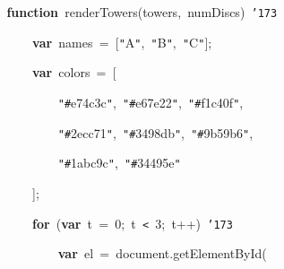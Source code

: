 \documentclass[a4paper,10pt]{article}
\def\mc{\relax}
\begin{document}
\noindent
\mbox{}{\tt\mc \ }{\tt\mc \ }{\tt\mc \ }{\tt\mc \ }{\tt\mc \ }{\tt\mc \ }{\tt\mc \ }{\tt\mc \ }\textbf{function}{\tt\mc \ }renderTowers(towers,{\tt\mc \ }numDiscs){\tt\mc \ }{\tt\char'173}

\noindent
\mbox{}{\tt\mc \ }{\tt\mc \ }{\tt\mc \ }{\tt\mc \ }{\tt\mc \ }{\tt\mc \ }{\tt\mc \ }{\tt\mc \ }{\tt\mc \ }{\tt\mc \ }{\tt\mc \ }{\tt\mc \ }\textbf{var}{\tt\mc \ }names{\tt\mc \ }={\tt\mc \ }[{\tt "}A{\tt "},{\tt\mc \ }{\tt "}B{\tt "},{\tt\mc \ }{\tt "}C{\tt "}];

\noindent
\mbox{}{\tt\mc \ }{\tt\mc \ }{\tt\mc \ }{\tt\mc \ }{\tt\mc \ }{\tt\mc \ }{\tt\mc \ }{\tt\mc \ }{\tt\mc \ }{\tt\mc \ }{\tt\mc \ }{\tt\mc \ }\textbf{var}{\tt\mc \ }colors{\tt\mc \ }={\tt\mc \ }[

\noindent
\mbox{}{\tt\mc \ }{\tt\mc \ }{\tt\mc \ }{\tt\mc \ }{\tt\mc \ }{\tt\mc \ }{\tt\mc \ }{\tt\mc \ }{\tt\mc \ }{\tt\mc \ }{\tt\mc \ }{\tt\mc \ }{\tt\mc \ }{\tt\mc \ }{\tt\mc \ }{\tt\mc \ }{\tt "}{\tt\#}e74c3c{\tt "},{\tt\mc \ }{\tt "}{\tt\#}e67e22{\tt "},{\tt\mc \ }{\tt "}{\tt\#}f1c40f{\tt "},

\noindent
\mbox{}{\tt\mc \ }{\tt\mc \ }{\tt\mc \ }{\tt\mc \ }{\tt\mc \ }{\tt\mc \ }{\tt\mc \ }{\tt\mc \ }{\tt\mc \ }{\tt\mc \ }{\tt\mc \ }{\tt\mc \ }{\tt\mc \ }{\tt\mc \ }{\tt\mc \ }{\tt\mc \ }{\tt "}{\tt\#}2ecc71{\tt "},{\tt\mc \ }{\tt "}{\tt\#}3498db{\tt "},{\tt\mc \ }{\tt "}{\tt\#}9b59b6{\tt "},

\noindent
\mbox{}{\tt\mc \ }{\tt\mc \ }{\tt\mc \ }{\tt\mc \ }{\tt\mc \ }{\tt\mc \ }{\tt\mc \ }{\tt\mc \ }{\tt\mc \ }{\tt\mc \ }{\tt\mc \ }{\tt\mc \ }{\tt\mc \ }{\tt\mc \ }{\tt\mc \ }{\tt\mc \ }{\tt "}{\tt\#}1abc9c{\tt "},{\tt\mc \ }{\tt "}{\tt\#}34495e{\tt "}

\noindent
\mbox{}{\tt\mc \ }{\tt\mc \ }{\tt\mc \ }{\tt\mc \ }{\tt\mc \ }{\tt\mc \ }{\tt\mc \ }{\tt\mc \ }{\tt\mc \ }{\tt\mc \ }{\tt\mc \ }{\tt\mc \ }];

\noindent
\mbox{}{\tt\mc \ }{\tt\mc \ }{\tt\mc \ }{\tt\mc \ }{\tt\mc \ }{\tt\mc \ }{\tt\mc \ }{\tt\mc \ }{\tt\mc \ }{\tt\mc \ }{\tt\mc \ }{\tt\mc \ }\textbf{for}{\tt\mc \ }(\textbf{var}{\tt\mc \ }t{\tt\mc \ }={\tt\mc \ }0;{\tt\mc \ }t{\tt\mc \ }{\tt <}{\tt\mc \ }3;{\tt\mc \ }t++){\tt\mc \ }{\tt\char'173}

\noindent
\mbox{}{\tt\mc \ }{\tt\mc \ }{\tt\mc \ }{\tt\mc \ }{\tt\mc \ }{\tt\mc \ }{\tt\mc \ }{\tt\mc \ }{\tt\mc \ }{\tt\mc \ }{\tt\mc \ }{\tt\mc \ }{\tt\mc \ }{\tt\mc \ }{\tt\mc \ }{\tt\mc \ }\textbf{var}{\tt\mc \ }el{\tt\mc \ }={\tt\mc \ }document.getElementById(
\end{document}
